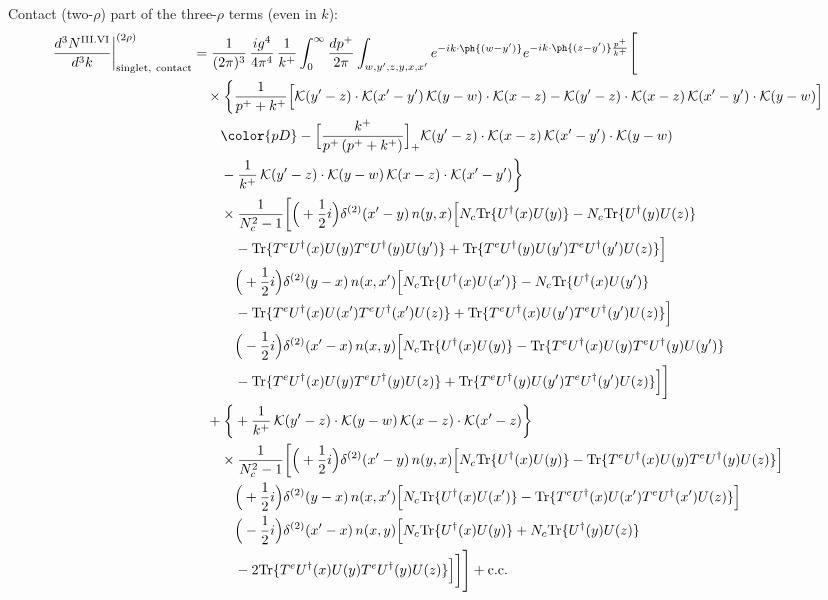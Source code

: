 Contact (two-$\rho$) part of the three-$\rho$ terms (even in $k$):
\begin{align}
\frac{d^{3}N^{\rm III.VI}}{d^{3}k}\bigg|^{(2\rho)}_{\rm singlet,\ contact}&=\frac{1}{(2\pi)^{3}}\,\frac{ig^{4}}{4\pi^{4}}\,\frac{1}{k^{+}}\int_{0}^{\infty}\frac{dp^{+}}{2\pi}\int_{w,y',z,y,x,x'}e^{-ik\cdot\ph{(w-y')}}e^{-ik\cdot\ph{(z-y')}\frac{p^{+}}{k^{+}}}\Bigg[\notag\\
&\quad\times\bigg\{\frac{1}{p^{+}+k^{+}}\Big[\mathcal{K}(y'-z)\cdot\mathcal{K}(x'-y')\,\mathcal{K}(y-w)\cdot\mathcal{K}(x-z)-\mathcal{K}(y'-z)\cdot\mathcal{K}(x-z)\,\mathcal{K}(x'-y')\cdot\mathcal{K}(y-w)\Big]\notag\\
&\qquad{\color{pD}-\Big[\frac{k^{+}}{p^{+}\,(p^{+}+k^{+})}\Big]_{+}\mathcal{K}(y'-z)\cdot\mathcal{K}(x-z)\,\mathcal{K}(x'-y')\cdot\mathcal{K}(y-w)}\notag\\
&\qquad-\frac{1}{k^{+}}\,\mathcal{K}(y'-z)\cdot\mathcal{K}(y-w)\,\mathcal{K}(x-z)\cdot\mathcal{K}(x'-y')\bigg\}\notag\\
&\qquad\times \frac{1}{N_{c}^{2}-1}\bigg[\Big(+\frac{1}{2}i\Big)\delta^{(2)}(x'-y)\,n(y,x)\Big[N_{c}{\rm Tr}\{U^{\dagger}(x)U(y)\}-N_{c}{\rm Tr}\{U^{\dagger}(y)U(z)\}\notag\\
&\qquad\quad -{\rm Tr}\{T^{e}U^{\dagger}(x)U(y)T^{e}U^{\dagger}(y)U(y')\}+{\rm Tr}\{T^{e}U^{\dagger}(y)U(y')T^{e}U^{\dagger}(y')U(z)\}\Big]\notag\\
&\qquad\quad \Big(+\frac{1}{2}i\Big)\delta^{(2)}(y-x)\,n(x,x')\Big[N_{c}{\rm Tr}\{U^{\dagger}(x)U(x')\}-N_{c}{\rm Tr}\{U^{\dagger}(x)U(y')\}\notag\\
&\qquad\quad -{\rm Tr}\{T^{e}U^{\dagger}(x)U(x')T^{e}U^{\dagger}(x')U(z)\}+{\rm Tr}\{T^{e}U^{\dagger}(x)U(y')T^{e}U^{\dagger}(y')U(z)\}\Big]\notag\\
&\qquad\quad \Big(-\frac{1}{2}i\Big)\delta^{(2)}(x'-x)\,n(x,y)\Big[N_{c}{\rm Tr}\{U^{\dagger}(x)U(y)\}-{\rm Tr}\{T^{e}U^{\dagger}(x)U(y)T^{e}U^{\dagger}(y)U(y')\}\notag\\
&\qquad\quad -{\rm Tr}\{T^{e}U^{\dagger}(x)U(y)T^{e}U^{\dagger}(y)U(z)\}+{\rm Tr}\{T^{e}U^{\dagger}(y)U(y')T^{e}U^{\dagger}(y')U(z)\}\Big]\bigg]\notag\\
&\quad+\bigg\{+\frac{1}{k^{+}}\,\mathcal{K}(y'-z)\cdot\mathcal{K}(y-w)\,\mathcal{K}(x-z)\cdot\mathcal{K}(x'-z)\bigg\}\notag\\
&\qquad\times \frac{1}{N_{c}^{2}-1}\bigg[\Big(+\frac{1}{2}i\Big)\delta^{(2)}(x'-y)\,n(y,x)\Big[N_{c}{\rm Tr}\{U^{\dagger}(x)U(y)\}-{\rm Tr}\{T^{e}U^{\dagger}(x)U(y)T^{e}U^{\dagger}(y)U(z)\}\Big]\notag\\
&\qquad\quad \Big(+\frac{1}{2}i\Big)\delta^{(2)}(y-x)\,n(x,x')\Big[N_{c}{\rm Tr}\{U^{\dagger}(x)U(x')\}-{\rm Tr}\{T^{e}U^{\dagger}(x)U(x')T^{e}U^{\dagger}(x')U(z)\}\Big]\notag\\
&\qquad\quad \Big(-\frac{1}{2}i\Big)\delta^{(2)}(x'-x)\,n(x,y)\Big[N_{c}{\rm Tr}\{U^{\dagger}(x)U(y)\}+N_{c}{\rm Tr}\{U^{\dagger}(y)U(z)\}\notag\\
&\qquad\quad -2{\rm Tr}\{T^{e}U^{\dagger}(x)U(y)T^{e}U^{\dagger}(y)U(z)\}\Big]\bigg]\Bigg]+{\rm c.c.}\label{eq:E-III.VI-2}
\end{align}

